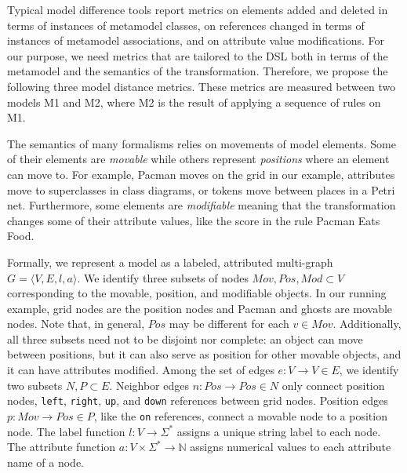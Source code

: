 Typical model difference tools report metrics on elements added and deleted in terms of instances of metamodel classes, on references changed in terms of instances of metamodel associations, and on attribute value modifications.
For our purpose, we need metrics that are tailored to the DSL both in terms of the metamodel and the semantics of the transformation.
Therefore, we propose the following three model distance metrics.
These metrics are measured between two models M1 and M2, where M2 is the result of applying a sequence of rules on M1.

The semantics of many formalisms relies on movements of model elements.
Some of their elements are \emph{movable} while others represent \emph{positions} where an element can move to.
For example, Pacman moves on the grid in our example, attributes move to superclasses in class diagrams, or tokens move between places in a Petri net.
Furthermore, some elements are \emph{modifiable} meaning that the transformation changes some of their attribute values, like the score in the rule Pacman Eats Food.

Formally, we represent a model as a labeled, attributed multi-graph $G=\langle V,E,l,a \rangle$.
We identify three subsets of nodes $Mov,Pos,Mod \subset V$ corresponding to the movable, position, and modifiable objects.
In our running example, grid nodes are the position nodes and Pacman and ghosts are movable nodes.
Note that, in general, $Pos$ may be different for each $v \in Mov$.
Additionally, all three subsets need not to be disjoint nor complete: an object can move between positions, but it can also serve as position for other movable objects, and it can have attributes modified.
Among the set of edges $e:V \rightarrow V \in E$, we identify two subsets $N,P \subset E$.
Neighbor edges $n: Pos \rightarrow Pos \in N$ only connect position nodes, \eg \texttt{left}, \texttt{right}, \texttt{up}, and \texttt{down} references between grid nodes.
Position edges $p: Mov \rightarrow Pos \in P$, like the \texttt{on} references, connect a movable node to a position node.
The label function $l:V \rightarrow \Sigma^*$ assigns a unique string label to each node.
The attribute function $a:V \times \Sigma^* \rightarrow \mathbb{N}$ assigns numerical values to each attribute name of a node.

